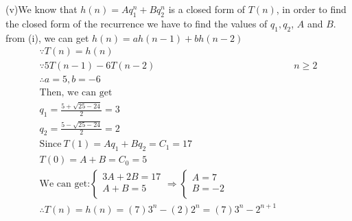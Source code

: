 \documentclass[12pt]{article}
\begin{document}
\newpage
\noindent
(v)We know that $h(n) = Aq_1^n+Bq_2^n$ is a closed form of $T(n)$, in order to find the closed form of the recurrence we have to find the values of $q_1, q_2$,  $A$ and $B$.\\
from (i), we can get $h(n) = ah(n-1) + bh(n-2)$
\begin{align*}
\because T(n) = h(n)\\
\because 5T(n-1)-6T(n-2)&\quad n\ge 2\\
\therefore a = 5, b = -6\\
\text{Then, we can get}\\
q_1 = \frac{5+\sqrt{25-24}}{2} = 3\\
q_2 = \frac{5-\sqrt{25-24}}{2} = 2\\
\text{Since}\  T(1)= Aq_1+Bq_2 = C_1 = 17\\
T(0)= A+B = C_0 = 5\\
\text{We can get:}
\begin{cases}
3A + 2B = 17\\
A + B = 5\\
\end{cases}
\Rightarrow
\begin{cases}
A = 7\\
B = -2\\
\end{cases}\\
\therefore T(n) = h(n) = (7)3^n - (2)2^n = (7)3^n - 2^{n+1}
\end{align*}
\end{document}
